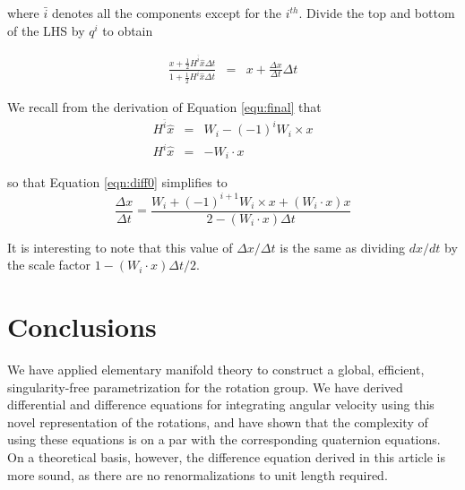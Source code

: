 \documentclass{gen-j-l}
\theoremstyle{definition}
\theoremstyle{remark}
\numberwithin{equation}{section}
\begin{document}
where $\bar{i}$ denotes all the components except for the $i^{th}$.
Divide the top and bottom of the LHS by $q^i$ to obtain

\begin{eqnarray}
\frac{ x + \frac{1}{2}H^{\bar i} \hat{x}\Delta t }
     { 1 + \frac{1}{2}H^i \hat{x} \Delta t } & = & 
x + \frac{\Delta x}{\Delta t} \Delta t
\label{eqn:diff0}
\end{eqnarray}

We recall from the derivation of Equation \ref{equ:final} that
\begin{eqnarray*}
H^{\bar i} \hat{x} & = & W_i - (-1)^i W_i \times x \\
H^i \hat{x} & = & - W_i \cdot x 
\end{eqnarray*}

so that Equation \ref{eqn:diff0} simplifies to
\begin{equation}
\frac{\Delta x}{\Delta t} =
\frac{W_i + (-1)^{i+1}W_i \times x + (W_i \cdot x) x}
     {2 - (W_i \cdot x) \Delta t}
\label{eqn:diff}
\end{equation}

It is interesting to note that this value of $\Delta x/\Delta t$
is the same as dividing $dx/dt$ by the scale factor
$1 - (W_i \cdot x) \Delta t / 2$.

\section{Conclusions}
\label{sec:conclusion}

We have applied elementary manifold theory to construct a global, efficient,
singularity-free parametrization for the rotation group.  We have
derived differential and difference equations 
for integrating angular velocity
using this novel representation of the rotations, and have shown that
the complexity of using these equations is on a par with
the corresponding quaternion equations.  On a theoretical
basis, however, the difference equation
derived in this article is
more sound, as there are no renormalizations to unit
length required.
\end{document}
